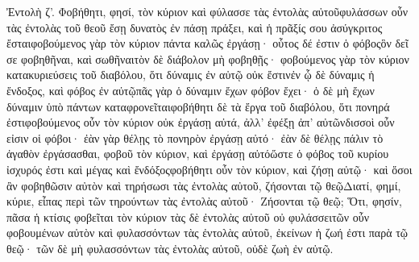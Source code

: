 Ἐντολὴ ζ’.
Φοβήθητι, φησί, τὸν κύριον καὶ φύλασσε τὰς ἐντολὰς αὐτοῦφυλάσσων οὖν τὰς ἐντολὰς τοῦ θεοῦ ἔσῃ δυνατὸς ἐν πάσῃ πράξει, καὶ ἡ πρᾶξίς σου ἀσύγκριτος ἔσταιφοβούμενος γὰρ τὸν κύριον πάντα καλῶς ἐργάσῃ· οὗτος δέ ἐστιν ὁ φόβοςὃν δεῖ σε φοβηθῆναι, καὶ σωθῆναιτὸν δὲ διάβολον μὴ φοβηθῇς· φοβούμενος γὰρ τὸν κύριον κατακυριεύσεις τοῦ διαβόλου, ὅτι δύναμις ἐν αὐτῷ οὐκ ἔστινἐν ᾧ δὲ δύναμις ἡ ἔνδοξος, καὶ φόβος ἐν αὐτῷπᾶς γὰρ ὁ δύναμιν ἔχων φόβον ἔχει· ὁ δὲ μὴ ἔχων δύναμιν ὑπὸ πάντων καταφρονεῖταιφοβήθητι δὲ τὰ ἔργα τοῦ διαβόλου, ὅτι πονηρά ἐστιφοβούμενος οὖν τὸν κύριον οὐκ ἐργάσῃ αὐτά, ἀλλ’ ἐφέξῃ ἀπ’ αὐτῶνδισσοὶ οὖν εἰσιν οἱ φόβοι· ἐὰν γὰρ θέλῃς τὸ πονηρὸν ἐργάσῃ αὐτό· ἐὰν δὲ θέλῃς πάλιν τὸ ἀγαθὸν ἐργάσασθαι, φοβοῦ τὸν κύριον, καὶ ἐργάσῃ αὐτόὥστε ὁ φόβος τοῦ κυρίου ἰσχυρός ἐστι καὶ μέγας καὶ ἔνδόξοςφοβήθητι οὖν τὸν κύριον, καὶ ζήσῃ αὐτῷ· καὶ ὅσοι ἂν φοβηθῶσιν αὐτὸν καὶ τηρήσωσι τὰς ἐντολὰς αὐτοῦ, ζήσονται τῷ θεῷΔιατί, φημί, κύριε, εἶπας περὶ τῶν τηρούντων τὰς ἐντολὰς αὐτοῦ· Ζήσονται τῷ θεῷ; Ὅτι, φησίν, πᾶσα ἡ κτίσις φοβεῖται τὸν κύριον τὰς δὲ ἐντολὰς αὐτοῦ οὐ φυλάσσειτῶν οὖν φοβουμένων αὐτὸν καὶ φυλασσόντων τὰς ἐντολὰς αὐτοῦ, ἐκείνων ἡ ζωή ἐστι παρὰ τῷ θεῷ· τῶν δὲ μὴ φυλασσόντων τὰς ἐντολὰς αὐτοῦ, οὐδὲ ζωὴ ἐν αὐτῷ.

